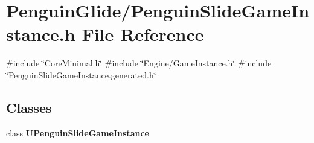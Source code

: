 \section{Penguin\+Glide/\+Penguin\+Slide\+Game\+Instance.h File Reference}
\label{_penguin_slide_game_instance_8h}
{\ttfamily \#include \char`\"{}Core\+Minimal.\+h\char`\"{}}\newline
{\ttfamily \#include \char`\"{}Engine/\+Game\+Instance.\+h\char`\"{}}\newline
{\ttfamily \#include \char`\"{}Penguin\+Slide\+Game\+Instance.\+generated.\+h\char`\"{}}\newline
\subsection*{Classes}
\begin{DoxyCompactItemize}
\item 
class \textbf{ U\+Penguin\+Slide\+Game\+Instance}
\end{DoxyCompactItemize}
